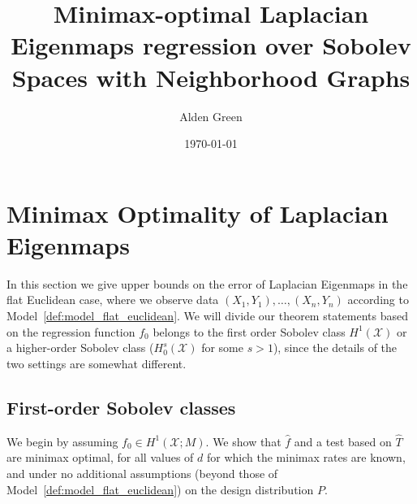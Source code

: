 \documentclass{article}
\newcommand{\1}{\mathbf{1}}
\newcommand{\mc}[1]{\mathcal{#1}}
\newcommand{\wh}[1]{\widehat{#1}}
\theoremstyle{alden}
\theoremstyle{aldenthm}
\theoremstyle{definition}
\theoremstyle{remark}
\begin{document}
\title{Minimax-optimal Laplacian Eigenmaps regression over Sobolev Spaces with Neighborhood Graphs}
\author{Alden Green}
\date{\today}
\maketitle




\section{Minimax Optimality of Laplacian Eigenmaps}
\label{sec:minimax_optimal_laplacian_eigenmaps}


In this section we give upper bounds on the error of Laplacian Eigenmaps in the flat Euclidean case, where we observe data $(X_1,Y_1),\ldots,(X_n,Y_n)$ according to Model~\ref{def:model_flat_euclidean}. We will divide our theorem statements based on the regression function $f_0$ belongs to the first order Sobolev class $H^1(\mc{X})$ or a higher-order Sobolev class ($H_0^{s}(\mc{X})$ for some $s > 1$), since the details of the two settings are somewhat different.

\subsection{First-order Sobolev classes}
\label{sec:first_order_sobolev_classes}
We begin by assuming $f_0 \in H^1(\mc{X}; M)$. We show that $\wh{f}$ and a test based on $\wh{T}$ are minimax optimal, for all values of $d$ for which the minimax rates are known, and under no additional assumptions (beyond those of Model~\ref{def:model_flat_euclidean}) on the design distribution $P$.
\end{document}
